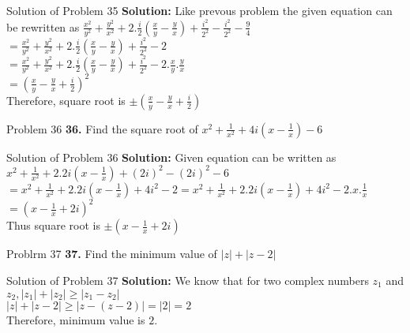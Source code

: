 \documentclass[aspectratio=169,8pt]{beamer}
\begin{document}
\begin{frame}{Solution of Problem 35}
  \textbf{Solution:} Like prevous problem the given equation can be rewritten as $\frac{x^2}{y^2} + \frac{y^2}{x^2} + 2.\frac{i}{2}\left(\frac{x}{y} - \frac{y}{x}\right) + \frac{i^2}{2^2} - \frac{i^2}{2^2} - \frac{9}{4}$\\
  \vspace*{0.2cm}
  $= \frac{x^2}{y^2} + \frac{y^2}{x^2} + 2.\frac{i}{2}\left(\frac{x}{y} - \frac{y}{x}\right) + \frac{i^2}{2^2} - 2$\\
  \vspace*{0.2cm}
  $= \frac{x^2}{y^2} + \frac{y^2}{x^2} + 2.\frac{i}{2}\left(\frac{x}{y} - \frac{y}{x}\right) + \frac{i^2}{2^2} - 2.\frac{x}{y}.\frac{y}{x}$\\
  \vspace*{0.2cm}
  $= \left(\frac{x}{y} - \frac{y}{x} + \frac{i}{2}\right)^2$\\
  \vspace*{0.2cm}
  Therefore, square root is $\pm\left(\frac{x}{y} - \frac{y}{x} + \frac{i}{2}\right)$
\end{frame}
\begin{frame}{Problem 36}
  \textbf{36.} Find the square root of $x^2 + \frac{1}{x^2} + 4i\left(x - \frac{1}{x}\right) - 6$
\end{frame}
\begin{frame}{Solution of Problem 36}
  \textbf{Solution:} Given equation can be written as $x^2 + \frac{1}{x^2} + 2.2i\left(x - \frac{1}{x}\right) + (2i)^2 - (2i)^2 - 6$\\
  \vspace*{0.2cm}
  $= x^2 + \frac{1}{x^2} + 2.2i\left(x - \frac{1}{x}\right) + 4i^2 - 2 = x^2 + \frac{1}{x^2} + 2.2i\left(x - \frac{1}{x}\right) + 4i^2 - 2.x.\frac{1}{x}$\\
  \vspace*{0.2cm}
  $= \left(x - \frac{1}{x} + 2i\right)^2$\\
  \vspace*{0.2cm}
  Thus square root is $\pm\left(x - \frac{1}{x} + 2i\right)$
\end{frame}
\begin{frame}{Problrm 37}
  \textbf{37.} Find the minimum value of $|z| + |z - 2|$
\end{frame}
\begin{frame}{Solution of Problem 37}
  \textbf{Solution:} We know that for two complex numbers $z_1$ and $z_2, |z_1| + |z_2|\geq |z_1 - z_2|$\\
  \vspace*{0.2cm}
  $|z| + |z - 2| \geq |z - (z - 2)| = |2| = 2$\\
  \vspace*{0.2cm}
  Therefore, minimum value is $2$.
\end{frame}
\end{document}
